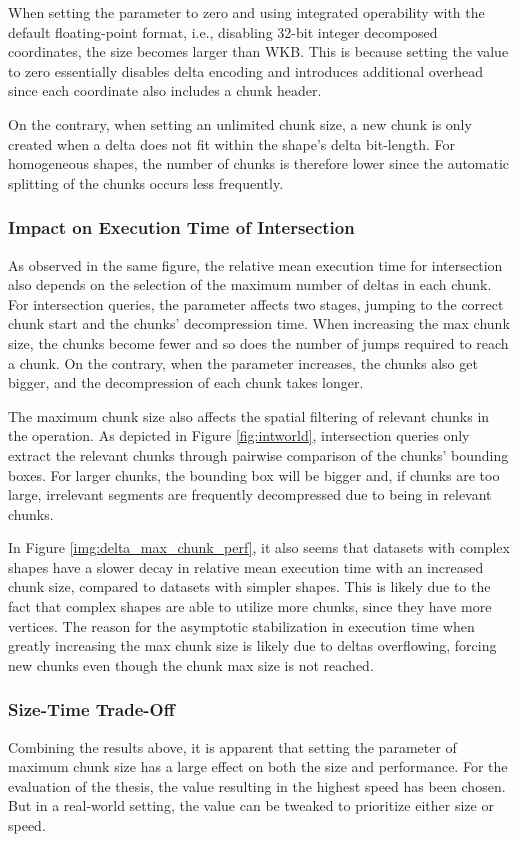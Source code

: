 When setting the parameter to zero and using integrated operability with the default floating-point format, i.e., disabling 32-bit integer decomposed coordinates, the size becomes larger than WKB. This is because setting the value to zero essentially disables delta encoding and introduces additional overhead since each coordinate also includes a chunk header.

On the contrary, when setting an unlimited chunk size, a new chunk is only created when a delta does not fit within the shape's delta bit-length. For homogeneous shapes, the number of chunks is therefore lower since the automatic splitting of the chunks occurs less frequently.

\subsubsection{Impact on Execution Time of Intersection}
As observed in the same figure, the relative mean execution time for intersection also depends on the selection of the maximum number of deltas in each chunk. For intersection queries, the parameter affects two stages, jumping to the correct chunk start and the chunks' decompression time. When increasing the max chunk size, the chunks become fewer and so does the number of jumps required to reach a chunk. On the contrary, when the parameter increases, the chunks also get bigger, and the decompression of each chunk takes longer.

The maximum chunk size also affects the spatial filtering of relevant chunks in the operation. As depicted in Figure \ref{fig:intworld}, intersection queries only extract the relevant chunks through pairwise comparison of the chunks' bounding boxes. For larger chunks, the bounding box will be bigger and, if chunks are too large, irrelevant segments are frequently decompressed due to being in relevant chunks.

In Figure \ref{img:delta_max_chunk_perf}, it also seems that datasets with complex shapes have a slower decay in relative mean execution time with an increased chunk size, compared to datasets with simpler shapes. This is likely due to the fact that complex shapes are able to utilize more chunks, since they have more vertices. The reason for the asymptotic stabilization in execution time when greatly increasing the max chunk size is likely due to deltas overflowing, forcing new chunks even though the chunk max size is not reached.

\subsubsection{Size-Time Trade-Off}
Combining the results above, it is apparent that setting the parameter of maximum chunk size has a large effect on both the size and performance. For the evaluation of the thesis, the value resulting in the highest speed has been chosen. But in a real-world setting, the value can be tweaked to prioritize either size or speed.





